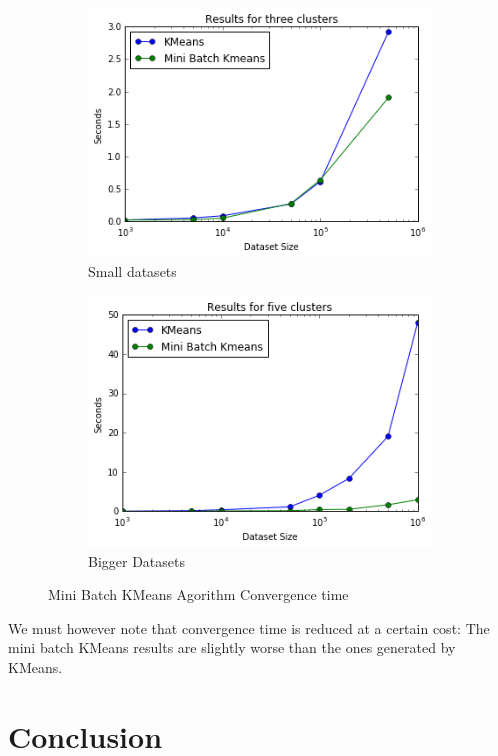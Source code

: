 \documentclass[11pt]{article}
\begin{document}
\begin{figure}[h!]
	\centering 
	\begin{subfigure}{0.48\textwidth}
		\includegraphics[width=\textwidth]{Figures/minibatch.png}
		\caption{Small datasets}
		\label{minibatch}
	\end{subfigure}
	\quad
	\begin{subfigure}{0.48\textwidth}
		\includegraphics[width=\textwidth]{Figures/minibatch2.png}
		\caption{Bigger Datasets}
			\label{minibatch2}
	\end{subfigure} 
	\caption{Mini Batch KMeans Agorithm Convergence time}
\end{figure}
\noindent We must however note that convergence time is reduced at a certain cost: The mini batch KMeans results are slightly worse than the ones generated by KMeans.


\section*{Conclusion}
\end{document}
